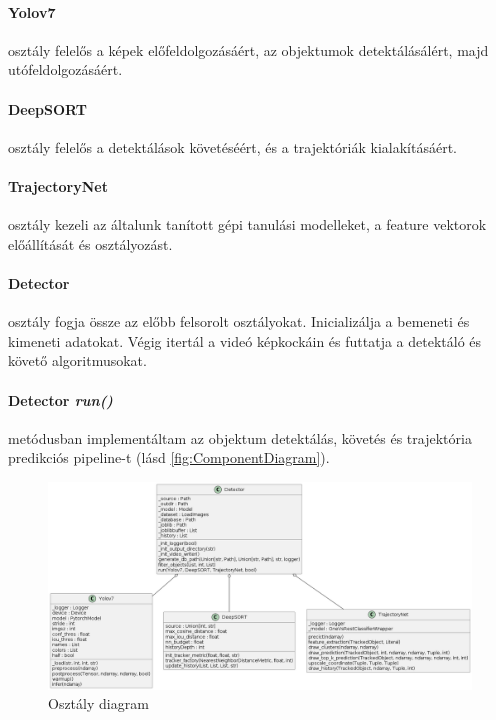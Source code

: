 \documentclass[12pt,a4paper]{article}
\begin{document}
\paragraph{Yolov7} osztály felelős a képek előfeldolgozásáért, az objektumok detektálásálért, majd utófeldolgozásáért.
\paragraph{DeepSORT} osztály felelős a detektálások követéséért, és a trajektóriák kialakításáért.
\paragraph{TrajectoryNet} osztály kezeli az általunk tanított gépi tanulási modelleket, a feature vektorok előállítását és osztályozást.
\paragraph{Detector} osztály fogja össze az előbb felsorolt osztályokat. Inicializálja a bemeneti és kimeneti adatokat. Végig itertál a videó képkockáin és futtatja a detektáló és követő algoritmusokat.
\paragraph{Detector \textit{run()}} metódusban implementáltam az objektum detektálás, követés és trajektória predikciós pipeline-t (lásd \ref{fig:ComponentDiagram}).

\begin{figure}[H]
    \includegraphics[width=1\columnwidth]{ClassArchitectureDiagram.png}
    \caption{Osztály diagram}
    \label{fig:ClassDiagram}
\end{figure}
\end{document}
